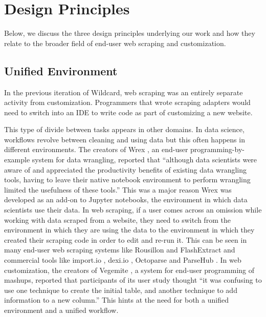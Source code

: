 \documentclass[sigconf,10pt]{acmart}
\begin{document}
\hypertarget{sec:design-principles}{%
\section{Design Principles}\label{sec:design-principles}}

Below, we discuss the three design principles underlying our work and
how they relate to the broader field of end-user web scraping and
customization.

\hypertarget{unified-environment}{%
\subsection{Unified Environment}\label{unified-environment}}

In the previous iteration of Wildcard, web scraping was an entirely
separate activity from customization. Programmers that wrote scraping
adapters would need to switch into an IDE to write code as part of
customizing a new website.

This type of divide between tasks appears in other domains. In data
science, workflows revolve between cleaning and using data but this
often happens in different environments. The creators of Wrex
\citep{drosos2020}, an end-user programming-by-example system for data
wrangling, reported that ``although data scientists were aware of and
appreciated the productivity benefits of existing data wrangling tools,
having to leave their native notebook environment to perform wrangling
limited the usefulness of these tools.'' This was a major reason Wrex
was developed as an add-on to Jupyter notebooks, the environment in
which data scientists use their data. In web scraping, if a user comes
across an omission while working with data scraped from a website, they
need to switch from the environment in which they are using the data to
the environment in which they created their scraping code in order to
edit and re-run it. This can be seen in many end-user web scraping
systems like Rousillon \citep{chasins2018}and FlashExtract
\citep{le2014} and commercial tools like import.io \citep{import.io},
dexi.io \citep{dexi.io}, Octoparse \citep{octoparse} and ParseHub
\citep{parsehub}. In web customization, the creators of Vegemite
\citep{lin2009}, a system for end-user programming of mashups, reported
that participants of its user study thought ``it was confusing to use
one technique to create the initial table, and another technique to add
information to a new column.'' This hints at the need for both a unified
environment and a unified workflow.
\end{document}
